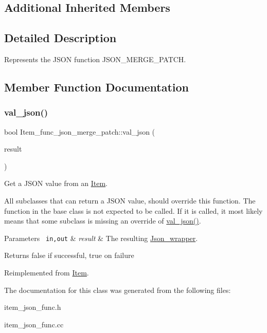 \subsection*{Additional Inherited Members}


\subsection{Detailed Description}
Represents the J\+S\+ON function J\+S\+O\+N\+\_\+\+M\+E\+R\+G\+E\+\_\+\+P\+A\+T\+CH. 

\subsection{Member Function Documentation}
\mbox{\label{classItem__func__json__merge__patch_a6f64e1bc4bc2fc67ecf0d00a96b74a2c}} 
\subsubsection{\texorpdfstring{val\+\_\+json()}{val\_json()}}
{\footnotesize\ttfamily bool Item\+\_\+func\+\_\+json\+\_\+merge\+\_\+patch\+::val\+\_\+json (\begin{DoxyParamCaption}\item[{\mbox{\hyperlink{classJson__wrapper}{Json\+\_\+wrapper}} $\ast$}]{result }\end{DoxyParamCaption})\hspace{0.3cm}{\ttfamily [virtual]}}

Get a J\+S\+ON value from an \mbox{\hyperlink{classItem}{Item}}.

All subclasses that can return a J\+S\+ON value, should override this function. The function in the base class is not expected to be called. If it is called, it most likely means that some subclass is missing an override of \mbox{\hyperlink{classItem__func__json__merge__patch_a6f64e1bc4bc2fc67ecf0d00a96b74a2c}{val\+\_\+json()}}.


\begin{DoxyParams}[1]{Parameters}
\mbox{\texttt{ in,out}}  & {\em result} & The resulting \mbox{\hyperlink{classJson__wrapper}{Json\+\_\+wrapper}}.\\
\hline
\end{DoxyParams}
\begin{DoxyReturn}{Returns}
false if successful, true on failure 
\end{DoxyReturn}


Reimplemented from \mbox{\hyperlink{classItem_a57e763fcde2d0a819d21e31c59611290}{Item}}.



The documentation for this class was generated from the following files\+:\begin{DoxyCompactItemize}
\item 
item\+\_\+json\+\_\+func.\+h\item 
item\+\_\+json\+\_\+func.\+cc\end{DoxyCompactItemize}
